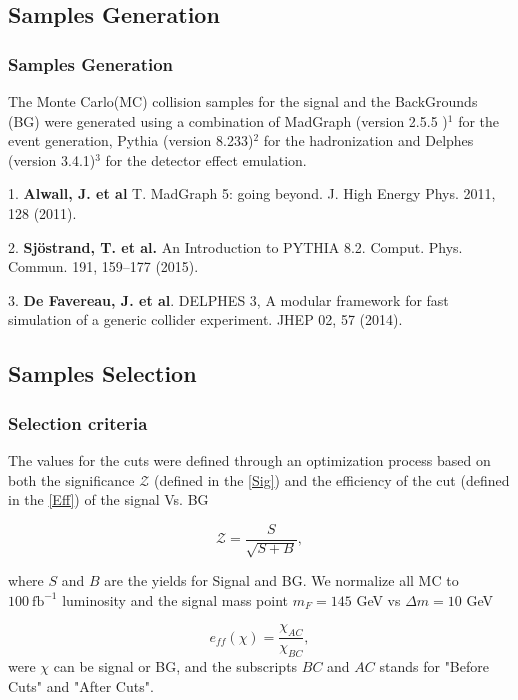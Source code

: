\documentclass{beamer}
\begin{document}
\begin{frame}
\section{Samples Generation}
\frametitle{Samples Generation}
\begin{justify}
The Monte Carlo(MC) collision samples for the signal and the BackGrounds (BG) were generated using a combination of MadGraph (version 2.5.5 )$^1$ %
for the event generation, Pythia (version 8.233)$^2$ 
for the hadronization and Delphes (version 3.4.1)$^3$  %
for the detector effect emulation.
\end{justify}

\begin{spacing}{0.5}
{\tiny
1. \textbf{Alwall, J. et al} T. MadGraph 5: going beyond. J. High Energy Phys. 2011, 128 (2011).

2. \textbf{Sjöstrand, T. et al.} An Introduction to PYTHIA 8.2. Comput. Phys. Commun. 191, 159–177 (2015).

3. \textbf{De Favereau, J. et al}. DELPHES 3, A modular framework for fast simulation of a generic collider experiment. JHEP 02, 57 (2014).
}
\end{spacing}
\end{frame}


\begin{frame}
\section{Samples Selection}
\frametitle{Selection criteria}
\begin{justify}
The values for the cuts were defined through an optimization process based on both the significance $\mathcal{Z}$ (defined in the \ref{Sig}) and the efficiency of the cut (defined in the \ref{Eff}) of the signal Vs. BG 

\begin{equation}
\mathcal{Z}=\frac{S}{\sqrt{S+B}},\label{Sig}
\end{equation}

where $S$ and $B$ are the yields for Signal and BG. We normalize all MC to $100~\text{fb}^{-1}$ luminosity and the    signal mass point  $m_{F}=145$ GeV vs  $\Delta m=10$ GeV

\begin{equation}
e_{ff}(\chi)=\frac{\chi_{AC}}{\chi_{BC}},\label{Eff}
\end{equation}
were $\chi$ can be signal or BG, and the subscripts $BC$ and $AC$ stands for "Before Cuts" and "After Cuts".

\end{justify}

\end{frame}
\end{document}
